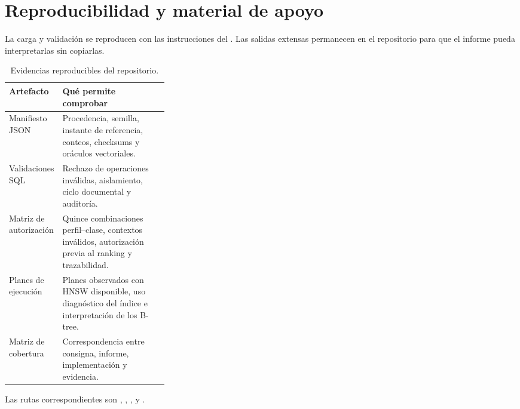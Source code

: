 \section{Reproducibilidad y material de apoyo}

La carga y validación se reproducen con las instrucciones del
. Las salidas extensas permanecen en el repositorio para que el
informe pueda interpretarlas sin copiarlas.

\begin{table}[ht]
\centering
\small
\begin{tabularx}{\textwidth}{>{\raggedright\arraybackslash}p{0.31\linewidth}Y}
\toprule
Artefacto & Qué permite comprobar \\
\midrule
Manifiesto JSON & Procedencia, semilla, instante de referencia, conteos, checksums y oráculos vectoriales. \\
Validaciones SQL & Rechazo de operaciones inválidas, aislamiento, ciclo documental y auditoría. \\
Matriz de autorización & Quince combinaciones perfil--clase, contextos inválidos, autorización previa al ranking y trazabilidad. \\
Planes de ejecución & Planes observados con HNSW disponible, uso diagnóstico del índice e interpretación de los B-tree. \\
Matriz de cobertura & Correspondencia entre consigna, informe, implementación y evidencia. \\
\bottomrule
\end{tabularx}
\caption{Evidencias reproducibles del repositorio.}
\end{table}

Las rutas correspondientes son ,
,
,
 y
.
